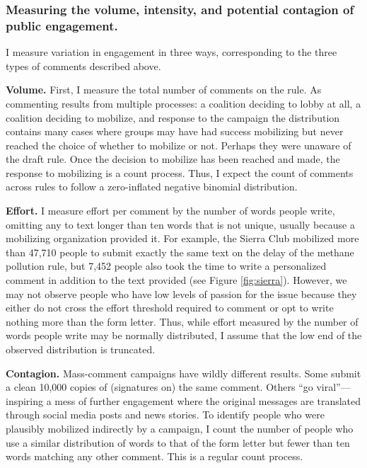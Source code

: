 \documentclass[
      12pt,
        ]{article}
\begin{document}
\hypertarget{measuring-the-volume-intensity-and-potential-contagion-of-public-engagement.}{%
\subsubsection{Measuring the volume, intensity, and potential contagion of public engagement.}\label{measuring-the-volume-intensity-and-potential-contagion-of-public-engagement.}}

I measure variation in engagement in three ways, corresponding to the
three types of comments described above.

\textbf{Volume.} First, I measure the total number of comments on the rule.
As commenting results from multiple processes: a coalition deciding to
lobby at all, a coalition deciding to mobilize, and response to the
campaign the distribution contains many cases where groups may have had
success mobilizing but never reached the choice of whether to mobilize
or not. Perhaps they were unaware of the draft rule. Once the decision
to mobilize has been reached and made, the response to mobilizing is a
count process. Thus, I expect the count of comments across rules to
follow a zero-inflated negative binomial distribution.

\textbf{Effort.} I measure effort per comment by the number of words people
write, omitting any to text longer than ten words that is not unique,
usually because a mobilizing organization provided it. For example, the Sierra Club mobilized more than 47,710
people to submit exactly the same text on the delay of the methane
pollution rule, but 7,452 people also took the time to write a
personalized comment in addition to the text provided (see Figure \ref{fig:sierra}). However, we may
not observe people who have low levels of passion for the issue because
they either do not cross the effort threshold required to comment or opt
to write nothing more than the form letter. Thus, while effort measured
by the number of words people write may be normally distributed, I
assume that the low end of the observed distribution is truncated.

\textbf{Contagion.} Mass-comment campaigns have wildly different results.
Some submit a clean 10,000 copies of (signatures on) the same comment.
Others ``go viral''---inspiring a mess of further engagement where the
original messages are translated through social media posts and news
stories. To identify people who were plausibly mobilized indirectly by a
campaign, I count the number of people who use a similar distribution of
words to that of the form letter but fewer than ten words matching any
other comment. This is a regular count process.
\end{document}
